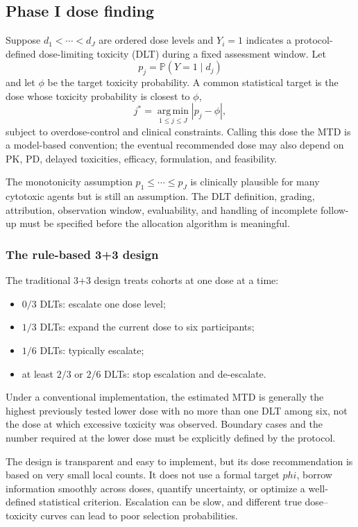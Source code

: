 \documentclass[12pt,oneside]{book}
\numberwithin{equation}{section}
\theoremstyle{definition}
\theoremstyle{plain}
\theoremstyle{remark}
\newcommand{\Prob}{\mathbb{P}}
\newcommand{\argmin}{\operatorname*{arg\,min}}
\newcommand{\abs}[1]{\left\lvert #1 \right\rvert}
\begin{document}
\subsection{Phase I dose finding}

Suppose $d_1<\cdots<d_J$ are ordered dose levels and $Y_i=1$ indicates a
protocol-defined dose-limiting toxicity (DLT) during a fixed assessment window.
Let
\[
 p_j=\Prob(Y=1\mid d_j)
\]
and let $\phi$ be the target toxicity probability.  A common statistical target
is the dose whose toxicity probability is closest to $\phi$,
\[
 j^*=\argmin_{1\leq j\leq J}\abs{p_j-\phi},
\]
subject to overdose-control and clinical constraints.  Calling this dose the
MTD is a model-based convention; the eventual recommended dose may also depend
on PK, PD, delayed toxicities, efficacy, formulation, and feasibility.

The monotonicity assumption $p_1\leq\cdots\leq p_J$ is clinically plausible for
many cytotoxic agents but is still an assumption.  The DLT definition, grading,
attribution, observation window, evaluability, and handling of incomplete
follow-up must be specified before the allocation algorithm is meaningful.

\subsubsection{The rule-based 3+3 design}

The traditional 3+3 design treats cohorts at one dose at a time:
\begin{itemize}
    \item $0/3$ DLTs: escalate one dose level;
    \item $1/3$ DLTs: expand the current dose to six participants;
    \item $1/6$ DLTs: typically escalate;
    \item at least $2/3$ or $2/6$ DLTs: stop escalation and de-escalate.
\end{itemize}
Under a conventional implementation, the estimated MTD is generally the
highest previously tested lower dose with no more than one DLT among six, not
the dose at which excessive toxicity was observed.  Boundary cases and the
number required at the lower dose must be explicitly defined by the protocol.

The design is transparent and easy to implement, but its dose recommendation
is based on very small local counts.  It does not use a formal target $phi$,
borrow information smoothly across doses, quantify uncertainty, or optimize a
well-defined statistical criterion.  Escalation can be slow, and different true
dose--toxicity curves can lead to poor selection probabilities.
\end{document}
